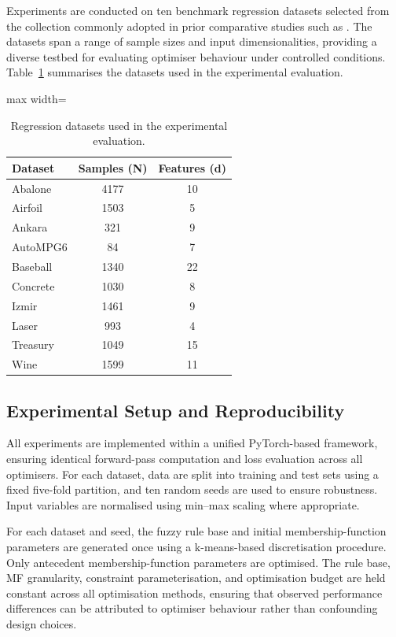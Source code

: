 \documentclass[conference]{IEEEtran}
\begin{document}
Experiments are conducted on ten benchmark regression datasets selected from
the collection commonly adopted in prior comparative studies such as
\cite{zhou2023stochastic}.
The datasets span a range of sample sizes and input dimensionalities, providing
a diverse testbed for evaluating optimiser behaviour under controlled
conditions.
Table~\ref{tab:datasets} summarises the datasets used in the experimental
evaluation.

\begin{table}[t]
\centering
\caption{Regression datasets used in the experimental evaluation.}
\label{tab:datasets}
\begin{adjustbox}{max width=\linewidth}
\begin{tabular}{lcc}
\toprule
\textbf{Dataset} & \textbf{Samples (N)} & \textbf{Features (d)} \\
\midrule
Abalone   & 4177 & 10 \\
Airfoil  & 1503 & 5  \\
Ankara   & 321  & 9  \\
AutoMPG6 & 84   & 7  \\
Baseball & 1340 & 22 \\
Concrete & 1030 & 8  \\
Izmir    & 1461 & 9  \\
Laser    & 993  & 4  \\
Treasury & 1049 & 15 \\
Wine     & 1599 & 11 \\
\bottomrule
\end{tabular}
\end{adjustbox}
\end{table}

\subsection{Experimental Setup and Reproducibility}

All experiments are implemented within a unified PyTorch-based framework,
ensuring identical forward-pass computation and loss evaluation across all
optimisers.
For each dataset, data are split into training and test sets using a fixed
five-fold partition, and ten random seeds are used to ensure robustness.
Input variables are normalised using min--max scaling where appropriate.

For each dataset and seed, the fuzzy rule base and initial membership-function
parameters are generated once using a k-means-based discretisation procedure.
Only antecedent membership-function parameters are optimised.
The rule base, MF granularity, constraint parameterisation, and optimisation
budget are held constant across all optimisation methods, ensuring that
observed performance differences can be attributed to optimiser behaviour
rather than confounding design choices.
\end{document}

